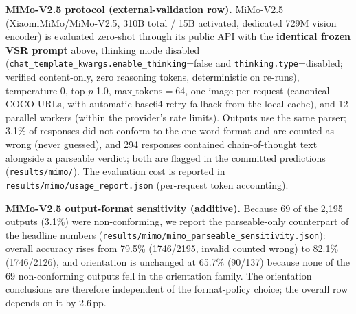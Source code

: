 \textbf{MiMo-V2.5 protocol (external-validation row).}
MiMo-V2.5 (XiaomiMiMo/MiMo-V2.5, 310B total / 15B activated, dedicated
729M vision encoder) is evaluated zero-shot through its public API with the
\textbf{identical frozen VSR prompt} above, thinking mode disabled
(\texttt{chat\_template\_kwargs.enable\_thinking}{=}false and
\texttt{thinking.type}{=}disabled; verified content-only, zero reasoning
tokens, deterministic on re-runs), temperature 0, top-$p$ 1.0,
$\mathrm{max\_tokens}{=}64$, one image per request (canonical COCO URLs,
with automatic base64 retry fallback from the local cache), and 12 parallel
workers (within the provider's rate limits). Outputs use the same parser;
3.1\% of responses did not conform to the one-word format and are counted as
wrong (never guessed), and 294 responses contained chain-of-thought text
alongside a parseable verdict; both are flagged in the committed predictions
(\texttt{results/mimo/}). The evaluation cost is reported in
\texttt{results/mimo/usage\_report.json} (per-request token accounting).

\textbf{MiMo-V2.5 output-format sensitivity (additive).} Because 69 of the
2{,}195 outputs (3.1\%) were non-conforming, we report the parseable-only
counterpart of the headline numbers
(\texttt{results/mimo/mimo\_parseable\_sensitivity.json}): overall accuracy
rises from 79.5\% (1746/2195, invalid counted wrong) to 82.1\% (1746/2126),
and orientation is unchanged at 65.7\% (90/137) because none of the 69
non-conforming outputs fell in the orientation family. The orientation
conclusions are therefore independent of the format-policy choice; the
overall row depends on it by 2.6\,pp.

